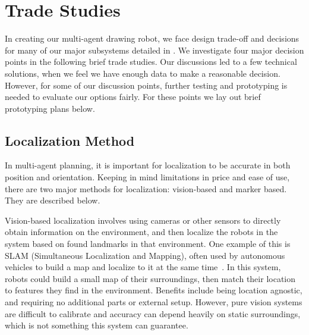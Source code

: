 
\section{Trade Studies}
\label{sec:trade_studies}


In creating our multi-agent drawing robot, we face design trade-off and decisions for many of our major subsystems detailed in . We investigate four major decision points in the following brief trade studies. Our discussions led to a few technical solutions, when we feel we have enough data to make a reasonable decision. However, for some of our discussion points, further testing and prototyping is needed to evaluate our options fairly. For these points we lay out brief prototyping plans below. 

\subsection{Localization Method}
\label{sec:trade_localization}
In multi-agent planning, it is important for localization to be accurate in both position and orientation. Keeping in mind limitations in price and ease of use, there are two major methods for localization: vision-based and marker based. They are described below.

Vision-based localization involves using cameras or other sensors to directly obtain information on the environment, and then localize the robots in the system based on found landmarks in that environment. One example of this is SLAM (Simultaneous Localization and Mapping), often used by autonomous vehicles to build a map and localize to it at the same time~\cite{dissanayake2001solution}. In this system, robots could build a small map of their surroundings, then match their location to features they find in the environment. Benefits include being location agnostic, and requiring no additional parts or external setup. However, pure vision systems are difficult to calibrate and accuracy can depend heavily on static surroundings, which is not something this system can guarantee.

